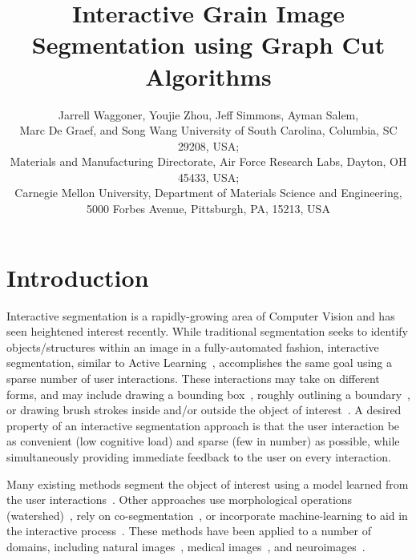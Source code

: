 \documentclass[]{spie}  %
\title{Interactive Grain Image Segmentation using Graph Cut Algorithms}
\author{Jarrell Waggoner\supit{a}, Youjie Zhou\supit{a}, Jeff Simmons\supit{b}, Ayman Salem\supit{b}, \\ Marc De Graef\supit{c}, and Song Wang\supit{a}
\skiplinehalf
\supit{a}University of South Carolina, Columbia, SC 29208, USA; \\
\supit{b}Materials and Manufacturing Directorate, Air Force Research
Labs, Dayton, OH 45433, USA; \\
\supit{c} Carnegie Mellon University, Department of Materials Science and Engineering, 5000 Forbes Avenue, Pittsburgh, PA, 15213, USA
}
\begin{document}
 
  \maketitle 

\begin{abstract}
% 

\end{abstract}




\section{Introduction}
\label{sec:intro}

Interactive segmentation is a rapidly-growing area of Computer Vision
and has seen heightened interest recently\cite{kuang:12,straehle:12}.
While traditional segmentation seeks to identify objects/structures
within an image in a fully-automated fashion, interactive
segmentation, similar to Active Learning~\cite{settles:09},
accomplishes the same goal using a sparse number of user interactions.
These interactions may take on different forms, and may include
drawing a bounding box~\cite{rother:04}, roughly outlining a
boundary~\cite{mortensen:95}, or drawing brush strokes inside and/or
outside the object of interest~\cite{santner:10, unger:08, boykov:01b,
  vezhnevets:95}.  A desired property of an interactive segmentation
approach is that the user interaction be as convenient (\ie low
cognitive load) and sparse (\ie few in number) as possible, while
simultaneously providing immediate feedback to the user on every
interaction.

Many existing methods segment the object of interest using a model
learned from the user interactions~\cite{boykov:01b, unger:08,
  rother:04}.  Other approaches use morphological operations
(watershed)~\cite{straehle:12}, rely on
co-segmentation~\cite{batra:10}, or incorporate machine-learning to
aid in the interactive process~\cite{top:11, kuang:12}.  These methods
have been applied to a number of domains, including natural
images~\cite{rother:04}, medical images~\cite{boykov:00}, and
neuroimages~\cite{straehle:11, straehle:12}.
\end{document}
